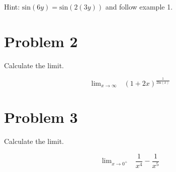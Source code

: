 \documentclass[11pt]{article}
\begin{document}
Hint: $\text{sin}(6y) = \text{sin}(2(3y))$ and follow example 1. 

\section*{Problem 2}

Calculate the limit.

$$\text{lim}_{x\rightarrow \infty} \quad (1+2x)^{\frac{1}{2\text{ln}(x)}}$$

\section*{Problem 3}

Calculate the limit.

$$\text{lim}_{x\rightarrow 0^+} \quad  \frac{1}{x^4} - \frac{1}{x^5}$$
\end{document}
